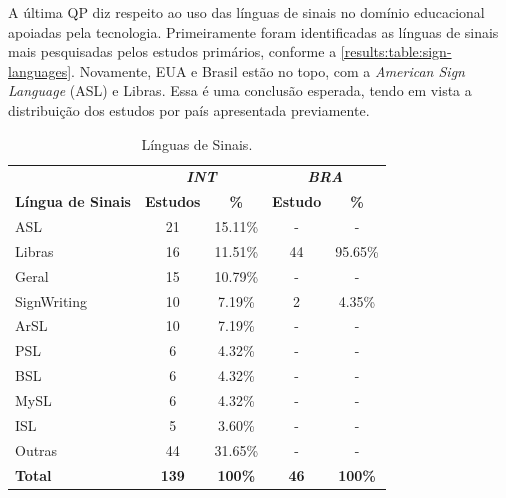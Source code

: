 A última QP diz respeito ao uso das línguas de sinais no domínio educacional apoiadas pela tecnologia. Primeiramente foram identificadas as línguas de sinais mais pesquisadas pelos estudos primários, conforme a \autoref{results:table:sign-languages}. Novamente, EUA e Brasil estão no topo, com a \textit{American Sign Language} (ASL) e Libras. Essa é uma conclusão esperada, tendo em vista a distribuição dos estudos por país apresentada previamente.

\begin{table}[htbp]
\caption{Línguas de Sinais.}
\label{results:table:sign-languages}
\centering
\begin{tabular}{lcccc}
\hline
           & \multicolumn{2}{c}{\textbf{\textit{INT}}} & \multicolumn{2}{c}{\textbf{\textit{BRA}}}  \\ \cline{2-5}

\textbf{Língua de Sinais} & \textbf{Estudos} & \textbf{\%}             & \textbf{Estudo} & \textbf{\%}               \\ \hline
ASL                       & 21               & 15.11\%                 & -               & -                         \\ 
Libras                    & 16               & 11.51\%                 & 44              & 95.65\%                   \\ 
Geral                     & 15               & 10.79\%                 & -               & -                         \\ 
SignWriting               & 10               & 7.19\%                  & 2               & 4.35\%                    \\ 
ArSL                      & 10               & 7.19\%                  & -               & -                         \\ 
PSL                       & 6                & 4.32\%                  & -               & -                         \\ 
BSL                       & 6                & 4.32\%                  & -               & -                         \\ 
MySL                      & 6                & 4.32\%                  & -               & -                         \\ 
ISL                       & 5                & 3.60\%                  & -               & -                         \\ 
Outras                    & 44               & 31.65\%                 & -               & -                         \\ 
\textbf{Total}            & \textbf{139}     & \textbf{100\%}          & \textbf{46}     & \textbf{100\%}            \\ \hline
\end{tabular}
\fautor
\end{table}

